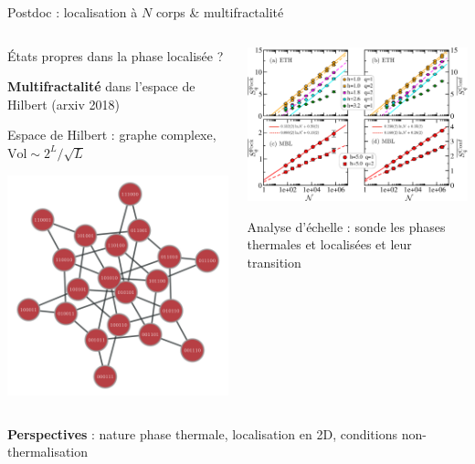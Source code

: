 \begin{frame}{Postdoc : localisation à $N$ corps \& multifractalité}
\begin{columns}
	\begin{column}{0.5\textwidth}
		États propres dans la phase localisée ?
	
		\textbf{Multifractalité} dans l'espace de Hilbert (arxiv 2018)
		
		Espace de Hilbert : graphe complexe, $\text{Vol} \sim 2^L/\sqrt{L}$
		
		\centering		
		\includegraphics[width=0.6\columnwidth]{img/1_travaux/graph_L_6}
	\end{column}
	\begin{column}{0.5\textwidth}
		{		
		\centering
		\includegraphics[width=0.8\columnwidth]{img/1_travaux/scalings}
		
		}		
		Analyse d'échelle : sonde les phases thermales et localisées et leur transition
				
	\end{column}
\end{columns}
\textbf{Perspectives} : nature phase thermale, localisation en 2D, conditions non-thermalisation
\end{frame}